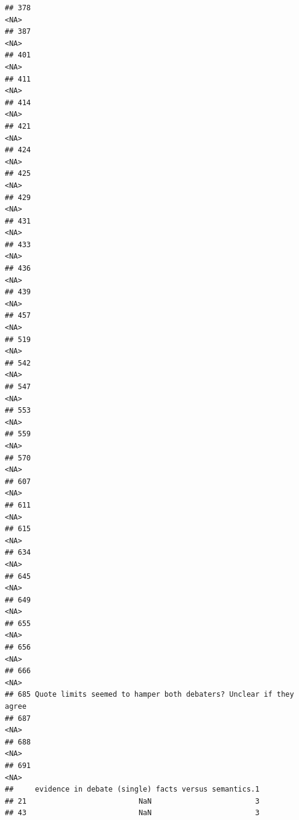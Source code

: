 \documentclass[
]{article}
\begin{document}
\begin{verbatim}
## 378                                                               <NA>
## 387                                                               <NA>
## 401                                                               <NA>
## 411                                                               <NA>
## 414                                                               <NA>
## 421                                                               <NA>
## 424                                                               <NA>
## 425                                                               <NA>
## 429                                                               <NA>
## 431                                                               <NA>
## 433                                                               <NA>
## 436                                                               <NA>
## 439                                                               <NA>
## 457                                                               <NA>
## 519                                                               <NA>
## 542                                                               <NA>
## 547                                                               <NA>
## 553                                                               <NA>
## 559                                                               <NA>
## 570                                                               <NA>
## 607                                                               <NA>
## 611                                                               <NA>
## 615                                                               <NA>
## 634                                                               <NA>
## 645                                                               <NA>
## 649                                                               <NA>
## 655                                                               <NA>
## 656                                                               <NA>
## 666                                                               <NA>
## 685 Quote limits seemed to hamper both debaters? Unclear if they agree
## 687                                                               <NA>
## 688                                                               <NA>
## 691                                                               <NA>
##     evidence in debate (single) facts versus semantics.1
## 21                          NaN                        3
## 43                          NaN                        3

\end{verbatim}
\end{document}
